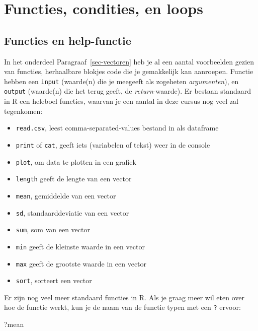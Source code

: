 \documentclass[
  a4paper,
]{scrbook}
\newenvironment{Shaded}{\begin{snugshade}}{\end{snugshade}}
\newcommand{\NormalTok}[1]{\textcolor[rgb]{0.00,0.23,0.31}{#1}}
\providecommand{\tightlist}{%
  \setlength{\itemsep}{0pt}\setlength{\parskip}{0pt}}\usepackage{longtable,booktabs,array}
\theoremstyle{definition}
\theoremstyle{remark}
\begin{document}
\section{Functies, condities, en
loops}\label{functies-condities-en-loops}

\subsection{Functies en help-functie}\label{sec-functies}

In het onderdeel Paragraaf~\ref{sec-vectoren} heb je al een aantal
voorbeelden gezien van functies, herhaalbare blokjes code die je
gemakkelijk kan aanroepen. Functie hebben een \texttt{input} (waarde(n)
die je meegeeft als zogeheten \emph{argumenten}), en \texttt{output}
(waarde(n) die het terug geeft, de \emph{return}-waarde). Er bestaan
standaard in R een heleboel functies, waarvan je een aantal in deze
cursus nog veel zal tegenkomen:

\begin{itemize}
\tightlist
\item
  \texttt{read.csv}, leest comma-separated-values bestand in als
  dataframe
\item
  \texttt{print} of \texttt{cat}, geeft iets (variabelen of tekst) weer
  in de console
\item
  \texttt{plot}, om data te plotten in een grafiek
\item
  \texttt{length} geeft de lengte van een vector
\item
  \texttt{mean}, gemiddelde van een vector
\item
  \texttt{sd}, standaarddeviatie van een vector
\item
  \texttt{sum}, som van een vector
\item
  \texttt{min} geeft de kleinste waarde in een vector
\item
  \texttt{max} geeft de grootste waarde in een vector
\item
  \texttt{sort}, sorteert een vector
\end{itemize}

Er zijn nog veel meer standaard functies in R. Als je graag meer wil
eten over hoe de functie werkt, kun je de naam van de functie typen met
een \texttt{?} ervoor:

\begin{Shaded}
\begin{Highlighting}[]
\NormalTok{?mean}
\end{Highlighting}
\end{Shaded}
\end{document}
